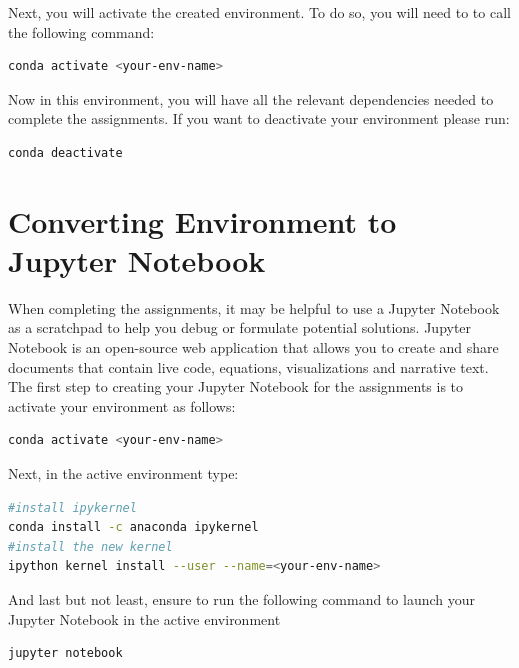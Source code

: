 \documentclass{article}
\begin{document}
Next, you will activate the created environment. To do so, you will need to to call the following command:
\begin{lstlisting}[language=bash]
conda activate <your-env-name>
\end{lstlisting}

Now in this environment, you will have all the relevant dependencies needed to complete the assignments. If you want to deactivate your environment please run:
\begin{lstlisting}[language=bash]
conda deactivate
\end{lstlisting}
 
\section{Converting Environment to Jupyter Notebook}
When completing the assignments, it may be helpful to use a Jupyter Notebook as a scratchpad to help you debug or formulate potential solutions. Jupyter Notebook is an open-source web application that allows you to create and share documents that contain live code, equations, visualizations and narrative text. The first step to creating your Jupyter Notebook for the assignments is to activate your environment as follows:
\begin{lstlisting}[language=bash]
conda activate <your-env-name>
\end{lstlisting}

Next, in the active environment type:
\begin{lstlisting}[language=bash]
#install ipykernel
conda install -c anaconda ipykernel
#install the new kernel
ipython kernel install --user --name=<your-env-name>
\end{lstlisting}

And last but not least, ensure to run the following command to launch your Jupyter Notebook in the active environment
\begin{lstlisting}[language=bash]
jupyter notebook
\end{lstlisting}
\end{document}

